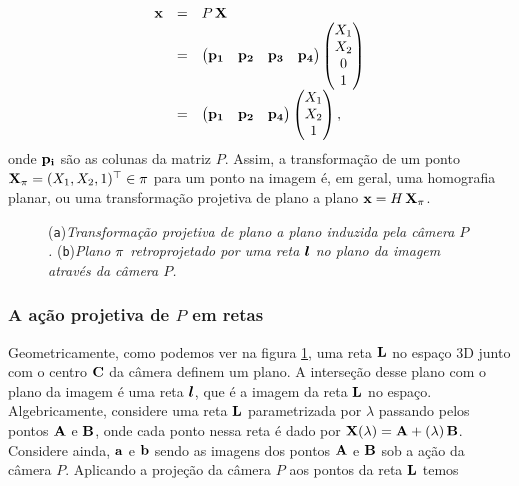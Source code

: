\begin{equation*}
\begin{array}{rcl}
\mathbf{x}&=&P\,\mathbf{X}\\
&=&
\begin{pmatrix}
{\bf p_1}&{\bf p_2}&{\bf p_3}&{\bf p_4}
\end{pmatrix}
\begin{pmatrix}
X_1\\
X_2\\
0\\
1
\end{pmatrix}\\
&=&
\begin{pmatrix}
{\bf p_1}&{\bf p_2}&{\bf p_4}
\end{pmatrix}
\begin{pmatrix}
X_1\\
X_2\\
1
\end{pmatrix},
\end{array}
\end{equation*}
onde ${\bf p_i}$ são as colunas da matriz $P$. Assim, a transformação de um ponto $\mathbf{X}_\pi=(X_1,X_2,1)^\top\in\pi$ para um ponto na imagem é, em geral, uma homografia planar, ou uma transformação projetiva de plano a plano $\mathbf{x}=H\,\mathbf{X}_\pi$.


\begin{figure}[htb!]
\centering
{}
\quad
{}
\caption{({\tt a})\textit{Transformação projetiva de plano a plano induzida pela câmera $P$.}\,\,({\tt b})\textit{Plano $\pi$ retroprojetado por uma reta $\boldsymbol{l}$ no plano da imagem através da câmera $P$.}}
\label{fig.projecao-planos-retas}
\end{figure}

\subsubsection{A ação projetiva de $P$ em retas}\label{sec.proj.retas}
Geometricamente, como podemos ver na figura \ref{fig.projecao-planos-retas}, uma reta ${\bf L}$ no espaço 3D junto com o centro ${\bf C}$ da câmera definem um plano. A interseção desse plano com o plano da imagem é uma reta $\boldsymbol{l}$, que é a imagem da reta ${\bf L}$ no espaço. Algebricamente, considere uma reta ${\bf L}$ parametrizada por $\lambda$ passando pelos pontos ${\bf A}$ e ${\bf B}$, onde cada ponto nessa reta é dado por $\mathbf{X}(\lambda)={\bf A}+(\lambda)\,{\bf B}$. Considere ainda, ${\bf a}$ e ${\bf b}$ sendo as imagens dos pontos ${\bf A}$ e ${\bf B}$ sob a ação da câmera $P$. Aplicando a projeção da câmera $P$ aos pontos da reta ${\bf L}$ temos


